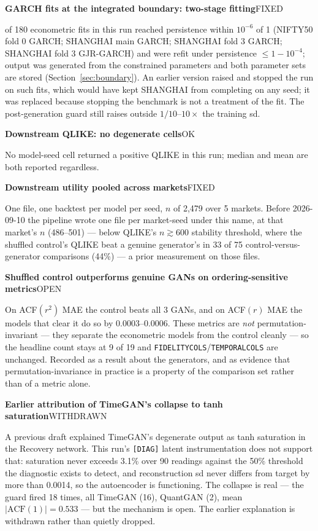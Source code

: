 \documentclass[11pt,a4paper]{article}
\makeatletter
\DeclareRobustCommand{\_}{\ifmmode\nfss@text{\textunderscore}\else\textunderscore\allowbreak\fi}
\newcommand{\auditrow}[5]{\par\medskip\noindent\textbf{#4}\hfill{\sffamily\footnotesize\textsc{#1}}\par\nopagebreak\noindent #5\par}
\makeatother
\begin{document}
\auditrow{FIXED}{Amber}{ABg}%
  {GARCH fits at the integrated boundary: two-stage fitting}%
  {12 of 180 econometric fits in this run reached persistence within $10^{-6}$ of 1 (NIFTY50 fold 0 GARCH; SHANGHAI main GARCH; SHANGHAI fold 3 GARCH; SHANGHAI fold 3 GJR-GARCH) and were refit under persistence $\le1-10^{-4}$; output was generated from the constrained parameters and both parameter sets are stored (Section~\ref{sec:boundary}). An earlier version raised and stopped the run on such fits, which would have kept SHANGHAI from completing on any seed; it was replaced because stopping the benchmark is not a treatment of the fit. The post-generation guard still raises outside $1/10$--$10\times$ the training sd.}

\auditrow{OK}{FGreen}{GBg}%
  {Downstream QLIKE: no degenerate cells}%
  {No model-seed cell returned a positive QLIKE in this run; median and mean are both reported regardless.}

\auditrow{FIXED}{Amber}{ABg}%
  {Downstream utility pooled across markets}%
  {One file, one backtest per model per seed, $n$ of 2,479 over 5 markets. Before 2026-09-10 the pipeline wrote one file per market-seed under this name, at that market's $n$ (486--501) --- below QLIKE's $n\gtrsim600$ stability threshold, where the shuffled control's QLIKE beat a genuine generator's in 33 of 75 control-versus-generator comparisons (44\%) --- a prior measurement on those files.}

\auditrow{OPEN}{Indigo}{IBg}%
  {Shuffled control outperforms genuine GANs on ordering-sensitive metrics}%
  {On ACF$(r^2)$ MAE the control beats all 3 GANs, and on ACF$(r)$ MAE the models that clear it do so by 0.0003--0.0006. These metrics are \emph{not} permutation-invariant --- they separate the econometric models from the control cleanly --- so the headline count stays at 9 of 19 and \texttt{FIDELITY\_COLS}/\texttt{TEMPORAL\_COLS} are unchanged. Recorded as a result about the generators, and as evidence that permutation-invariance in practice is a property of the comparison set rather than of a metric alone.}

\auditrow{WITHDRAWN}{Amber}{ABg}%
  {Earlier attribution of TimeGAN's collapse to tanh saturation}%
  {A previous draft explained TimeGAN's degenerate output as tanh saturation in the Recovery network. This run's \texttt{[DIAG]} latent instrumentation does not support that: saturation never exceeds 3.1\% over 90 readings against the 50\% threshold the diagnostic exists to detect, and reconstruction sd never differs from target by more than 0.0014, so the autoencoder is functioning. The collapse is real --- the guard fired 18 times, all TimeGAN (16), QuantGAN (2), mean $|\text{ACF}(1)| = 0.533$ --- but the mechanism is open. The earlier explanation is withdrawn rather than quietly dropped.}
\end{document}
